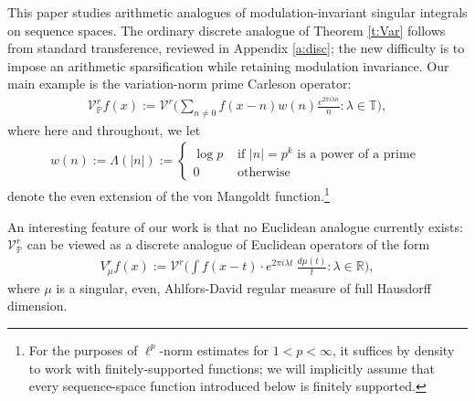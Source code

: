 \documentclass[12pt]{amsart}
\numberwithin{equation}{section}
\theoremstyle{definition}
\begin{document}
This paper studies arithmetic analogues of modulation-invariant singular integrals
on sequence spaces.  The ordinary discrete analogue of Theorem \ref{t:Var} follows
from standard transference, reviewed in Appendix \ref{a:disc}; the new difficulty is
to impose an arithmetic sparsification while retaining modulation invariance.  Our
main example is the variation-norm prime Carleson operator: 
\begin{align}\label{e:Carweight}
    \mathcal{V}^r_{\mathbb{P}} f(x) := \mathcal{V}^r \big(\sum_{n \neq 0} f(x-n) w(n) \frac{e^{2 \pi i \lambda n}}{n} : \lambda \in \mathbb{T} \big),
\end{align}
where here and throughout, we let
\begin{align}\label{e:wweight}
    w(n) := \Lambda(|n|) := \begin{cases} \log p & \text{ if } |n| = p^k \text{ is a power of a prime } \\
    0 & \text{ otherwise} \end{cases}
\end{align}
denote the even extension of the von Mangoldt function.\footnote{For the purposes of $\ell^p$-norm estimates for $1 < p < \infty$, it suffices by density to work with finitely-supported functions; we will implicitly assume that every sequence-space function introduced below is finitely supported.}

An interesting feature of our work is that no Euclidean analogue currently exists: $\mathcal{V}^r_{\mathbb{P}}$ can be viewed as a discrete analogue of Euclidean operators of the form
\begin{align}\label{e:Cmu}
   V^r_\mu f(x) := \mathcal{V}^r \big( \int f(x-t) \cdot e^{2 \pi i \lambda t} \ \frac{d\mu(t)}{t} : \lambda \in \mathbb{R} \big),
\end{align}
where $\mu$ is a singular, even, Ahlfors-David regular measure of full Hausdorff dimension. 
\end{document}
